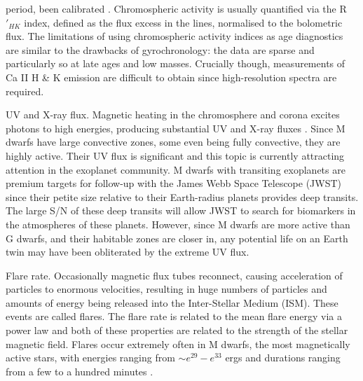 \begin{itemize}
{{period, been calibrated \citep[\eg][]{Soderblom1991, Donahue1993,
Lachaume1999, Mamajek2008}.
Chromospheric activity is usually quantified via the R$\prime_{HK}$ index,
defined as the flux excess in the lines, normalised to the bolometric flux.
The limitations of using chromospheric activity indices as age diagnostics are
similar to the drawbacks of gyrochronology: the data are sparse and
particularly so at late ages and low masses.
Crucially though, measurements of Ca II H \& K emission are difficult to
obtain since high-resolution spectra are required.
}
\item{UV and X-ray flux.}
Magnetic heating in the chromosphere and corona excites photons to high
energies, producing substantial UV and X-ray fluxes
\citep[\eg][]{Pallavicini1981}.
Since M dwarfs have large convective zones, some even being fully convective,
they are highly active.
Their UV flux is significant and this topic is currently attracting attention
in the exoplanet community.
M dwarfs with transiting exoplanets are premium targets for follow-up with the
James Webb Space Telescope (JWST) since their petite size relative to their
Earth-radius planets provides deep transits.
The large S/N of these deep transits will allow JWST to search for biomarkers
in the atmospheres of these planets.
However, since M dwarfs are more active than G dwarfs, and their habitable
zones are closer in, any potential life on an Earth twin may have been
obliterated by the extreme UV flux.}
\item{Flare rate.
Occasionally magnetic flux tubes reconnect, causing acceleration of particles
to enormous velocities, resulting in huge numbers of particles and amounts of
energy being released into the Inter-Stellar Medium (ISM).
These events are called flares.
The flare rate is related to the mean flare energy via a power law
\citep{Hawley2014, Davenport2015} and both of these properties are related to
the strength of the stellar magnetic field.
Flares occur extremely often in M dwarfs, the most magnetically active stars,
with energies ranging from $\sim e^{29} - e^{33}$ ergs and durations ranging
from a few to a hundred minutes \citep{Hawley2014}.}
\end{itemize}

